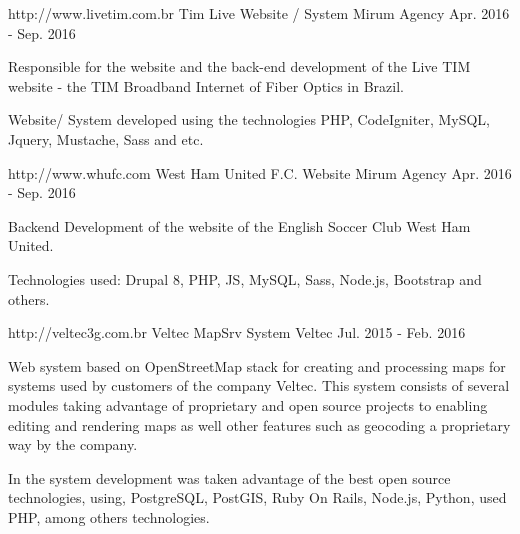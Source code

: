 \begin{cventries}

  \cventry
    {http://www.livetim.com.br} %
    {Tim Live Website / System} %
    {Mirum Agency} %
    {Apr. 2016 - Sep. 2016} %
    {
      \begin{cvitems} %
        \item {Responsible for the website and the back-end development of the Live TIM website - the TIM Broadband Internet of Fiber Optics in Brazil.}
        \item {Website/ System developed using the technologies PHP, CodeIgniter, MySQL, Jquery, Mustache, Sass and etc.}
      \end{cvitems}
    }


 \cventry
    {http://www.whufc.com} %
    {West Ham United F.C. Website} %
    {Mirum Agency} %
    {Apr. 2016 - Sep. 2016} %
    {
      \begin{cvitems} %
        \item {Backend Development of the website of the English Soccer Club West Ham United.}
         \item { Technologies used: Drupal 8, PHP, JS, MySQL, Sass, Node.js, Bootstrap and others.}
      \end{cvitems}
    }


 \cventry
    {http://veltec3g.com.br} %
    {Veltec MapSrv System} %
    {Veltec} %
    {Jul. 2015 - Feb. 2016} %
    {
      \begin{cvitems} %
        \item {Web system based on OpenStreetMap stack for creating and processing maps for systems used by customers of the company Veltec. This system consists of several modules taking advantage of proprietary and open source projects to enabling editing and rendering maps as well other features such as geocoding a proprietary way by the company.}
         \item {In the system development was taken advantage of the best open source technologies, using, PostgreSQL, PostGIS, Ruby On Rails, Node.js, Python, used PHP, among others technologies.}
      \end{cvitems}
    }

\end{cventries}
